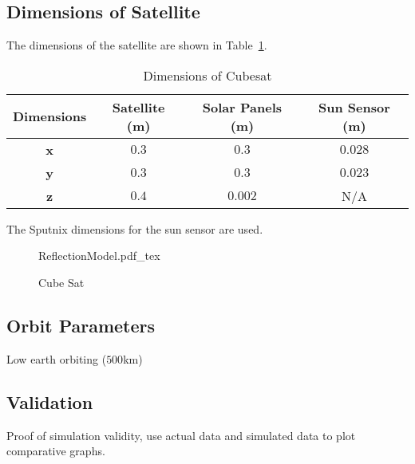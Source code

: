 \documentclass[letterpaper, 10 pt, conference]{ieeeconf}  %
\begin{document}
\subsection{Dimensions of Satellite}
The dimensions of the satellite are shown in Table~\ref{Table:Dimensions}.

\begin{table}[!htb]
	\caption{\label{Table:Dimensions}Dimensions of Cubesat}
	\begin{tabular}{|c|c|c|c|}
		\hline
		\textbf{Dimensions} & \textbf{Satellite (m)} & \textbf{Solar Panels (m)} & \textbf{Sun Sensor (m)} \\ \hline
		\textbf{x}          & $0.3$                    & $0.3$                       & $0.028$                   \\ \hline
		\textbf{y}          & $0.3$                    & $0.3$                       & $0.023$                   \\ \hline
		\textbf{z}          & $0.4$                    & $0.002$                     & N/A                     \\ \hline
	\end{tabular}
\end{table}
The Sputnix dimensions for the sun sensor are used.
\begin{figure}[!htb]
	\centering
	\def\svgwidth{7cm}
	{ReflectionModel.pdf_tex}
	\caption{Cube Sat}
	\label{fig:CubeSat}
\end{figure}

\subsection{Orbit Parameters}
Low earth orbiting ($500$km)

\subsection{Validation}
Proof of simulation validity, use actual data and simulated data to plot comparative graphs. 
\end{document}
